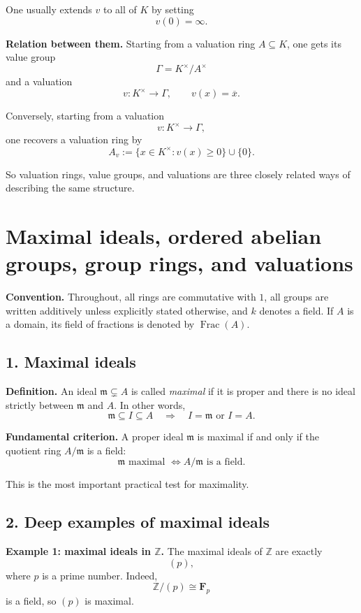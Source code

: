 \documentclass[12pt,a4paper]{article}
\theoremstyle{notespace}
\DeclareMathOperator{\Frac}{Frac}
\begin{document}
One usually extends \(v\) to all of \(K\) by setting
\[
v(0)=\infty.
\]

\medskip

\textbf{Relation between them.}
Starting from a valuation ring \(A\subseteq K\), one gets its value group
\[
\Gamma=K^\times/A^\times
\]
and a valuation
\[
v:K^\times\to \Gamma,\qquad v(x)=\overline{x}.
\]

Conversely, starting from a valuation
\[
v:K^\times\to \Gamma,
\]
one recovers a valuation ring by
\[
A_v:=\{x\in K^\times : v(x)\ge 0\}\cup\{0\}.
\]

So valuation rings, value groups, and valuations are three closely related ways of describing the same structure.	
	
\section{Maximal ideals, ordered abelian groups, group rings, and valuations}

\textbf{Convention.}
Throughout, all rings are commutative with \(1\), all groups are written additively unless explicitly stated otherwise, and \(k\) denotes a field. If \(A\) is a domain, its field of fractions is denoted by \(\Frac(A)\).

\subsection{1. Maximal ideals}

\textbf{Definition.}
An ideal \(\mathfrak m \subsetneq A\) is called \emph{maximal} if it is proper and there is no ideal strictly between \(\mathfrak m\) and \(A\). In other words,
\[
\mathfrak m \subseteq I \subseteq A
\quad \Longrightarrow \quad
I=\mathfrak m \text{ or } I=A.
\]

\textbf{Fundamental criterion.}
A proper ideal \(\mathfrak m\) is maximal if and only if the quotient ring \(A/\mathfrak m\) is a field:
\[
\mathfrak m \text{ maximal } \iff A/\mathfrak m \text{ is a field.}
\]

This is the most important practical test for maximality.

\subsection{2. Deep examples of maximal ideals}

\textbf{Example 1: maximal ideals in \(\mathbb Z\).}
The maximal ideals of \(\mathbb Z\) are exactly
\[
(p),
\]
where \(p\) is a prime number. Indeed,
\[
\mathbb Z/(p)\cong \mathbf F_p
\]
is a field, so \((p)\) is maximal.
\end{document}
